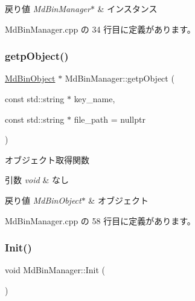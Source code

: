 \begin{DoxyRetVals}{戻り値}
{\em Md\+Bin\+Manager$\ast$} & インスタンス \\
\hline
\end{DoxyRetVals}


 Md\+Bin\+Manager.\+cpp の 34 行目に定義があります。

\mbox{\label{class_md_bin_manager_abfdfbf033bef1ff3fe51a0b610e51bc6}} 
\subsubsection{\texorpdfstring{getp\+Object()}{getpObject()}}
{\footnotesize\ttfamily \mbox{\hyperlink{class_md_bin_object}{Md\+Bin\+Object}} $\ast$ Md\+Bin\+Manager\+::getp\+Object (\begin{DoxyParamCaption}\item[{const std\+::string $\ast$}]{key\+\_\+name,  }\item[{const std\+::string $\ast$}]{file\+\_\+path = {\ttfamily nullptr} }\end{DoxyParamCaption})}



オブジェクト取得関数 


\begin{DoxyParams}{引数}
{\em void} & なし \\
\hline
\end{DoxyParams}

\begin{DoxyRetVals}{戻り値}
{\em Md\+Bin\+Object$\ast$} & オブジェクト \\
\hline
\end{DoxyRetVals}


 Md\+Bin\+Manager.\+cpp の 58 行目に定義があります。

\mbox{\label{class_md_bin_manager_a650a250f797759d90708241b5718fe49}} 
\subsubsection{\texorpdfstring{Init()}{Init()}}
{\footnotesize\ttfamily void Md\+Bin\+Manager\+::\+Init (\begin{DoxyParamCaption}{ }\end{DoxyParamCaption})}



